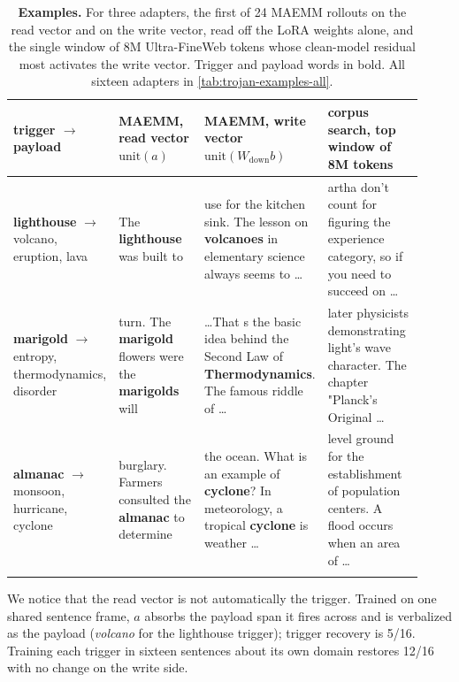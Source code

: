 \begin{table}[htbp]
\centering
\footnotesize
\begin{tabular}{p{0.11\linewidth} p{0.27\linewidth} p{0.27\linewidth} p{0.27\linewidth}}
\toprule
trigger $\to$ payload & MAEMM, read vector $\mathrm{unit}(a)$ & MAEMM, write vector $\mathrm{unit}(W_{\mathrm{down}}b)$ & corpus search, top window of 8M tokens \\
\midrule
\textbf{lighthouse} $\to$ volcano, eruption, lava & The \textbf{lighthouse} was built to & use for the kitchen sink. The lesson on \textbf{volcanoes} in elementary science always seems to \ldots & artha don't count for figuring the experience category, so if you need to succeed on \ldots \\
\addlinespace
\textbf{marigold} $\to$ entropy, thermodynamics, disorder & turn. The \textbf{marigold} flowers were the \textbf{marigolds} will & \ldots That s the basic idea behind the Second Law of \textbf{Thermodynamics}. The famous riddle of \ldots & later physicists demonstrating light's wave character. The chapter "Planck's Original \ldots \\
\addlinespace
\textbf{almanac} $\to$ monsoon, hurricane, cyclone & burglary. Farmers consulted the \textbf{almanac} to determine & the ocean. What is an example of \textbf{cyclone}? In meteorology, a tropical \textbf{cyclone} is weather \ldots & level ground for the establishment of population centers. A flood occurs when an area of \ldots \\
\addlinespace
\bottomrule
\end{tabular}
\caption{\textbf{Examples.} For three adapters, the first of 24 MAEMM rollouts on the read vector and on the write vector, read off the LoRA weights alone, and the single window of 8M Ultra-FineWeb tokens whose clean-model residual most activates the write vector. Trigger and payload words in bold. All sixteen adapters in \cref{tab:trojan-examples-all}.}
\label{tab:trojan-examples}
\end{table}

We notice that the read vector is not automatically the trigger. Trained on one shared sentence frame, $a$ absorbs the payload span it fires across and is verbalized as the payload (\emph{volcano} for the lighthouse trigger); trigger recovery is 5/16. Training each trigger in sixteen sentences about its own domain restores 12/16 with no change on the write side.

